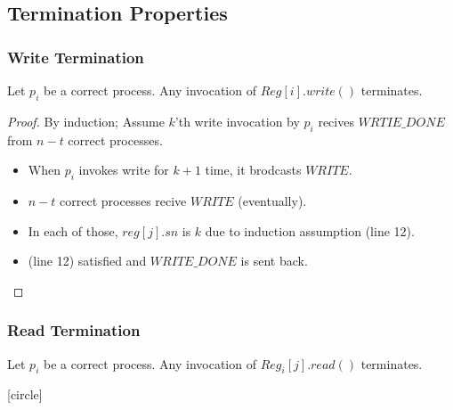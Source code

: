 \subsection{Termination Properties}
\begin{frame}
    \frametitle{Write Termination}
    \begin{lemma}
        Let $p_i$ be a correct process.
        Any invocation of $Reg[i].write()$ terminates.
    \end{lemma}
    \begin{proof}
        By induction; Assume $k$'th write invocation by $p_i$ recives $WRTIE\_DONE$ from $n-t$ correct processes.
        \begin{itemize}
            \item When $p_i$ invokes write for $k+1$ time, it brodcasts $WRITE$.
            \item $n-t$ correct processes recive $WRITE$ (eventually).
            \item In each of those, $reg[j].sn$ is $k$ due to induction assumption (line 12).
            \item (line 12) satisfied and $WRITE\_DONE$ is sent back.
        \end{itemize}
    \end{proof}
\end{frame}
\begin{frame}
    \frametitle{Read Termination}
    \begin{lemma}
        Let $p_i$ be a correct process. Any invocation of $Reg_i[j].read()$ terminates.
    \end{lemma}
\end{frame}
[circle]

